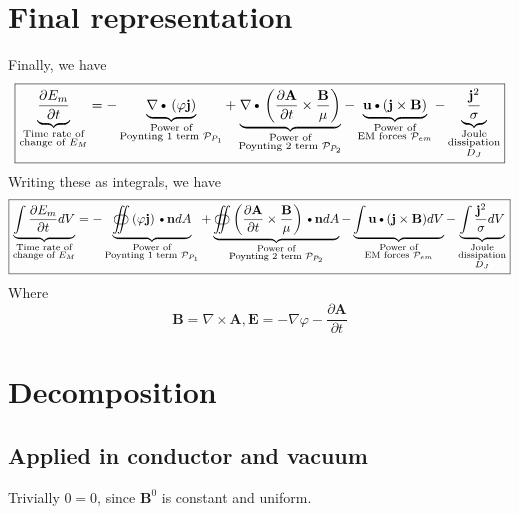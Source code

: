 \documentclass[11pt]{article}
\newcommand{\A}{\mathbf{A}}
\newcommand{\B}{\mathbf{B}}
\newcommand{\PD}{\partial}
\newcommand{\BM}{\frac{\mathbf{B}}{\mu}}
\newcommand{\J}{\mathbf{j}}
\newcommand{\E}{\mathbf{E}}
\newcommand{\N}{\mathbf{n}}
\newcommand{\JSS}{\frac{\mathbf{j}^2}{\sigma}}
\newcommand{\U}{\mathbf{u}}
\newcommand{\DOT}{\text{\textbullet}}
\begin{document}
\section{Final representation}
Finally, we have
\begin{equation}
	\boxed{
	\underbrace{\frac{\PD E_m}{\PD t} }_
	{\substack{\text{Time rate of}\\\text{change of $E_M$}}}
	=
	- \underbrace{\nabla \DOT \left(\varphi \J \right) }_
	{\substack{\text{Power of}\\\text{Poynting 1 term $\mathcal P_{P_1}$}}}
	+ \underbrace{\nabla \DOT \left( \frac{\PD \A}{\PD t} \times \BM \right)}_
	{\substack{\text{Power of}\\\text{Poynting 2 term $\mathcal P_{P_2}$}}}
	- \underbrace{\U \DOT (\J \times \B)}_
	{\substack{\text{Power of}\\\text{EM forces $\mathcal P_{em}$}}}
	- \underbrace{\JSS}_
	{\substack{\text{Joule}\\\text{dissipation}\\\text{$D_J$}}}
	}
\end{equation}
Writing these as integrals, we have
\begin{equation}
	\boxed{
	\underbrace{\int \frac{\PD E_m}{\PD t} dV}_
	{\substack{\text{Time rate of}\\\text{change of $E_M$}}}
	=
	- \underbrace{\oiint \left(\varphi \J \right) \DOT \N dA }_
	{\substack{\text{Power of}\\\text{Poynting 1 term $\mathcal P_{P_1}$}}}
	+ \underbrace{\oiint \left( \frac{\PD \A}{\PD t} \times \BM \right)\DOT \N dA }_
	{\substack{\text{Power of}\\\text{Poynting 2 term $\mathcal P_{P_2}$}}}
	- \underbrace{\int \U \DOT (\J \times \B) dV}_
	{\substack{\text{Power of}\\\text{EM forces $\mathcal P_{em}$}}}
	- \underbrace{\int \JSS dV}_
	{\substack{\text{Joule}\\\text{dissipation}\\\text{$D_J$}}}
	}
\end{equation}
Where
\begin{equation}
	\B = \nabla \times \A, \E = - \nabla \varphi - \frac{\PD \A}{\PD t}
\end{equation}
\section{Decomposition}
\subsection{Applied in conductor and vacuum}
Trivially $0 = 0$, since $\B^0$ is constant and uniform.
\end{document}

